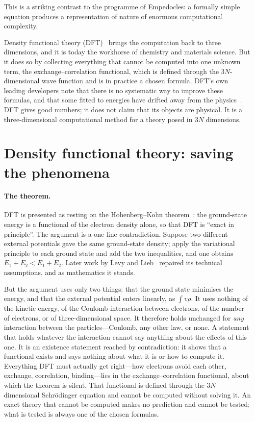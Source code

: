 \documentclass[11pt]{article}
\begin{document}
This is a striking contrast to the programme of Empedocles: a formally simple equation produces a
representation of nature of enormous computational complexity.

Density functional theory (DFT)~\cite{hk,ks} brings the computation back to three dimensions, and it is today the
workhorse of chemistry and materials science. But it does so by collecting everything that cannot be
computed into one unknown term, the exchange--correlation functional, which is defined through the
$3N$-dimensional wave function and is in practice a chosen formula. DFT's own leading developers note
that there is no systematic way to improve these formulas, and that some fitted to energies have drifted
away from the physics~\cite{burke,medvedev}. DFT gives good numbers; it does not claim that its objects are physical. It is a
three-dimensional computational method for a theory posed in $3N$ dimensions.

\section{Density functional theory: saving the phenomena}

\paragraph{The theorem.} DFT is presented as resting on the Hohenberg--Kohn theorem~\cite{hk}: the
ground-state energy is a functional of the electron density alone, so that DFT is ``exact in principle''.
The argument is a one-line contradiction. Suppose two different external potentials gave the same
ground-state density; apply the variational principle to each ground state and add the two inequalities,
and one obtains $E_1+E_2<E_1+E_2$. Later work by Levy and Lieb~\cite{levy,lieb} repaired its technical
assumptions, and as mathematics it stands.

But the argument uses only two things: that the ground state minimises the energy, and that the external
potential enters linearly, as $\int v\rho$. It uses nothing of the kinetic energy, of the Coulomb
interaction between electrons, of the number of electrons, or of three-dimensional space. It therefore
holds unchanged for \emph{any} interaction between the particles---Coulomb, any other law, or none.
A statement that holds whatever the interaction cannot say anything about the effects of this one. It is
an existence statement reached by contradiction: it shows that a functional exists and says nothing about
what it is or how to compute it. Everything DFT must actually get right---how electrons avoid each other,
exchange, correlation, binding---lies in the exchange--correlation functional, about which the theorem is
silent. That functional is defined through the $3N$-dimensional Schr\"odinger equation and cannot be
computed without solving it. An exact theory that cannot be computed makes no prediction and cannot be
tested; what is tested is always one of the chosen formulas.
\end{document}
